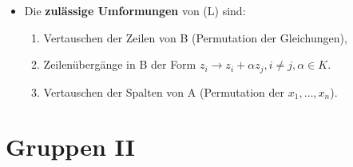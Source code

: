 \begin{itemize}
\begin{remark}
\end{remark}
\item Die \textbf{zulässige Umformungen} von (L) sind:
\begin{enumerate}
\item Vertauschen der Zeilen von B (Permutation der Gleichungen),
\item Zeilenübergänge in B der Form $z_i \to z_i+\alpha z_j, i \neq j,\alpha \in K$.
\item Vertauschen der Spalten von A (Permutation der $x_1, …, x_n$).
\end{enumerate}
\end{itemize}

\section{Gruppen II}
